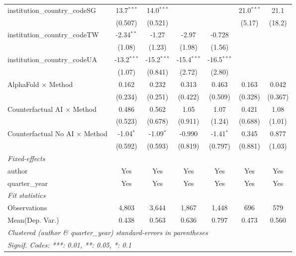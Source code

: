 \begin{tabular}{lcccccc}
   institution\_country\_codeSG          & 13.7$^{***}$  & 14.0$^{***}$  &               &               & 21.0$^{***}$  & 21.1\\   
                                         & (0.507)       & (0.521)       &               &               & (5.17)        & (18.2)\\   
   institution\_country\_codeTW          & -2.34$^{**}$  & -1.27         & -2.97         & -0.728        &               &   \\   
                                         & (1.08)        & (1.23)        & (1.98)        & (1.56)        &               &   \\   
   institution\_country\_codeUA          & -13.2$^{***}$ & -15.2$^{***}$ & -15.4$^{***}$ & -16.5$^{***}$ &               &   \\   
                                         & (1.07)        & (0.841)       & (2.72)        & (2.80)        &               &   \\   
   AlphaFold $\times$ Method             & 0.162         & 0.232         & 0.313         & 0.463         & 0.163         & 0.042\\   
                                         & (0.234)       & (0.251)       & (0.422)       & (0.509)       & (0.328)       & (0.367)\\   
   Counterfactual AI $\times$ Method     & 0.486         & 0.562         & 1.05          & 1.07          & 0.421         & 1.08\\   
                                         & (0.523)       & (0.678)       & (0.911)       & (1.24)        & (0.688)       & (1.01)\\   
   Counterfactual No AI $\times$ Method  & -1.04$^{*}$   & -1.09$^{*}$   & -0.990        & -1.41$^{*}$   & 0.345         & 0.877\\   
                                         & (0.592)       & (0.593)       & (0.819)       & (0.797)       & (0.881)       & (1.03)\\   
   \midrule
   \emph{Fixed-effects}\\
   author                                & Yes           & Yes           & Yes           & Yes           & Yes           & Yes\\  
   quarter\_year                         & Yes           & Yes           & Yes           & Yes           & Yes           & Yes\\  
   \midrule
   \emph{Fit statistics}\\
   Observations                          & 4,803         & 3,644         & 1,867         & 1,448         & 696           & 579\\  
Mean(Dep. Var.) & 0.438 & 0.563 & 0.636 & 0.797 & 0.473 & 0.560 \\
   \midrule \midrule
   \multicolumn{7}{l}{\emph{Clustered (author \& quarter\_year) standard-errors in parentheses}}\\
   \multicolumn{7}{l}{\emph{Signif. Codes: ***: 0.01, **: 0.05, *: 0.1}}\\
\end{tabular}
\par\endgroup
